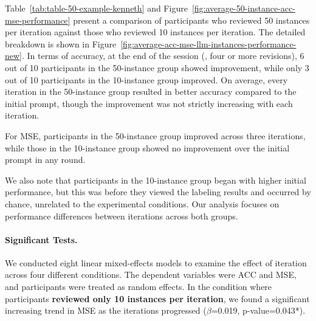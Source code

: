 Table~\ref{tab:table-50-example-kenneth} and Figure~\ref{fig:average-50-instance-acc-mse-performance} present a comparison of participants who reviewed 50 instances per iteration against those who reviewed 10 instances per iteration. The detailed breakdown is shown in Figure~\ref{fig:average-acc-mse-llm-instances-performance-new}.
In terms of accuracy, at the end of the session (\ie, four or more revisions),
6 out of 10 participants in the 50-instance group showed improvement, while only 3 out of 10 participants in the 10-instance group improved.
On average, every iteration in the 50-instance group resulted in better accuracy compared to the initial prompt, though the improvement was not strictly increasing with each iteration.

For MSE, participants in the 50-instance group improved across three iterations, while those in the 10-instance group showed no improvement over the initial prompt in any round.

We also note that participants in the 10-instance group began with higher initial performance, but this was before they viewed the labeling results and occurred by chance, unrelated to the experimental conditions. 
Our analysis focuses on performance differences between iterations across both groups.

\paragraph{Significant Tests.}
We conducted eight linear mixed-effects models to examine the effect of iteration across four different conditions. 
The dependent variables were ACC and MSE, and participants were treated as random effects.
In the condition where participants \textbf{reviewed only 10 instances per iteration}, we found a significant increasing trend in MSE as the iterations progressed ($\beta$=0.019, p-value=0.043*). 


